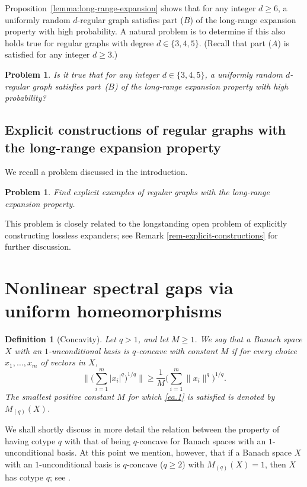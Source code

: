 \documentclass[11pt,leqno]{amsart}
\newtheorem{definition}[theorem]{Definition}
\newtheorem{problem}[theorem]{Problem}
\theoremstyle{remark}
\theoremstyle{plain}
\begin{document}
Proposition~\ref{lemma:long-range-expansion} shows that for any integer $d\geqslant 6$, a uniformly random $d$-regular graph
satisfies part (\hyperref[Part-B]{$B$}) of the long-range expansion property with high probability. 
A natural problem is to determine if this also holds true for regular graphs with degree $d\in \{3,4,5\}$.
(Recall that part (\hyperref[Part-A]{$A$}) is satisfied for any integer $d\geqslant 3$.)
\begin{problem} \label{pr-3}
Is it true that for any integer $d\in\{3,4,5\}$, a uniformly random $d$-regular graph satisfies part~\emph{(\hyperref[Part-B]{$B$})}
of the long-range expansion property with high probability?
\end{problem}

\subsection{Explicit constructions of regular graphs with the long-range expansion property}
We recall a problem discussed in the introduction.
\begin{problem} \label{pr-4}
Find explicit examples of regular graphs with the long-range expansion property.
\end{problem}
This problem is closely related to the longstanding open problem of explicitly constructing lossless expanders; see Remark \ref{rem-explicit-constructions} for further discussion.

\appendix

\section{Nonlinear spectral gaps via uniform homeomorphisms} \label{appendix}

\begin{definition}[Concavity] \label{q-concave}
Let $q>1$, and let $M\geqslant 1$. We say that a Banach space $X$ with an $1$-unconditional basis is
\emph{$q$-concave with constant $M$} if for every choice $x_1,\dots,x_m$ of vectors in $X$,
\begin{equation} \label{ea.1}
\Bigg\| \Big( \sum_{i=1}^m |x_i|^q \Big)^{1/q} \Bigg\| \geqslant \frac{1}{M} \Big( \sum_{i=1}^m  \|x_i\|^q\Big)^{1/q}.
\end{equation}
The smallest positive constant $M$ for which \eqref{ea.1} is satisfied is denoted by $M_{(q)}(X)$.
\end{definition}
We shall shortly discuss in more detail the relation between the property of having cotype $q$ with that of being
$q$-concave for Banach spaces with an $1$-unconditional basis. At this point we mention, however, that
if a Banach space $X$ with an $1$-unconditional basis is $q$-concave ($q\geqslant 2$) with $M_{(q)}(X)=1$, then $X$
has cotype $q$; see \cite[Theorems 1.e.16 and 1.f.1]{LT79}.
\end{document}
